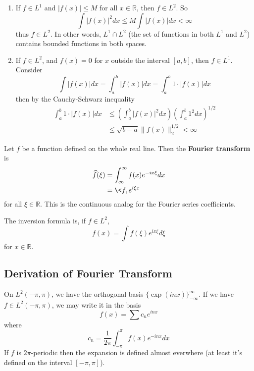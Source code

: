 \begin{enumerate}
\item If $f\in L^1$ and $|f(x)|\leq M$ for all
  $x\in\mathbb{R}$, then $f\in L^2$. So
\begin{equation}
\int |f(x)|^2dx\leq M\int|f(x)|dx<\infty
\end{equation}
thus $f\in L^2$. In other words, $L^{1}\cap L^{2}$ (the set
of functions in both $L^1$ and $L^2$) contains bounded
functions in both spaces.
\item If $f\in L^{2}$, and $f(x)=0$ for $x$ outside the
  interval $[a,b]$, then $f\in L^{1}$. Consider
\begin{equation}
\int|f(x)|dx = \int^{b}_{a}|f(x)|dx =
\int^{b}_{a}1\cdot|f(x)|dx
\end{equation}
then by the Cauchy-Schwarz inequality
\begin{subequations}
\begin{align}
\int^{b}_{a}1\cdot|f(x)|dx&\leq\left(\int^{b}_{a}|f(x)|^2dx\right)\left(\int^{b}_{a}1^{2}dx\right)^{1/2}\\
&\leq\sqrt{b-a}\|f(x)\|^{1/2}_{2}<\infty
\end{align}
\end{subequations}
\end{enumerate}

\begin{defn}
Let $f$ be a function defined on the whole real line. Then
the \textbf{Fourier transform} is
\begin{subequations}
\begin{align}
\widehat{f}(\xi) &= \int^{\infty}_{\infty}f(x)e^{-ix\xi}dx\\
&=\<f,e^{i\xi x}\>
\end{align}
\end{subequations}
for all $\xi\in\mathbb{R}$. This is the continuous analog
for the Fourier series coefficients.
\end{defn}

The inversion formula is, if $f\in L^2$, 
\begin{equation}
f(x) = \int \widehat{f}(\xi)e^{ix\xi}d\xi
\end{equation}
for $x\in\mathbb{R}$.

\subsection{Derivation of Fourier Transform}
On $L^{2}(-\pi,\pi)$, we have the orthogonal basis
$\{\exp(inx)\}^{\infty}_{-\infty}$. If we have $f\in
L^{2}(-\pi,\pi)$, we may write it in the basis
\begin{equation}
f(x) = \sum c_{n}e^{inx}
\end{equation}
where
\begin{equation}
c_{n} = \frac{1}{2\pi}\int^{\pi}_{-\pi}f(x)e^{-inx}dx
\end{equation}
If $f$ is $2\pi$-periodic then the expansion is defined
almost everwhere (at least it's defined on the interval
$[-\pi,\pi]$).

